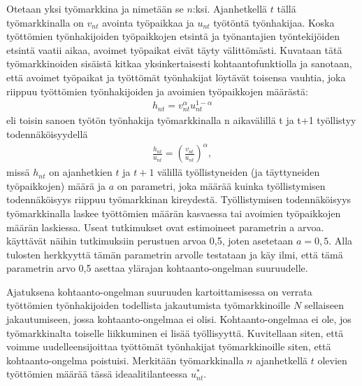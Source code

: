 \documentclass[12pt]{article}
\begin{document}
Otetaan yksi työmarkkina ja nimetään se $n$:ksi. Ajanhetkellä $t$ tällä työmarkkinalla on $v_{nt}$ avointa työpaikkaa ja $u_{nt}$ työtöntä työnhakijaa. Koska työttömien työnhakijoiden työpaikkojen etsintä ja työnantajien työntekijöiden etsintä vaatii aikaa, avoimet työpaikat eivät täyty välittömästi. Kuvataan tätä työmarkkinoiden sisäistä kitkaa yksinkertaisesti kohtaantofunktiolla ja sanotaan, että avoimet työpaikat ja työttömät työnhakijat löytävät toisensa vauhtia, joka riippuu työttömien työnhakijoiden ja avoimien työpaikkojen määrästä: 
\begin{align*}
h_{nt} = v_{nt}^\alpha u_{nt}^{1-\alpha}
\end{align*}
eli toisin sanoen työtön työnhakija työmarkkinalla n aikavälillä t ja t+1 työllistyy todennäköisyydellä 
\begin{align*}
\frac{h_{nt}}{u_{nt}} = \left ( \frac{v_{nt}}{u_{nt}} \right ) ^\alpha,
\end{align*}
missä $h_{nt}$ on ajanhetkien $t$ ja $t+1$ välillä työllistyneiden (ja täyttyneiden työpaikkojen) määrä ja $a$ on parametri, joka määrää kuinka työllistymisen todennäköisyys riippuu työmarkkinan kireydestä. Työllistymisen todennäköisyys työmarkkinalla laskee työttömien määrän kasvaessa tai avoimien työpaikkojen määrän laskiessa. Useat tutkimukset ovat estimoineet parametrin a arvoa.  käyttävät näihin tutkimuksiin perustuen arvoa 0,5, joten asetetaan $a = 0,5$. Alla tulosten herkkyyttä tämän parametrin arvolle testataan ja käy ilmi, että tämä parametrin arvo 0,5 asettaa ylärajan kohtaanto-ongelman suuruudelle.

Ajatuksena kohtaanto-ongelman suuruuden kartoittamisessa on verrata työttömien työnhakijoiden todellista jakautumista työmarkkinoille $N$ sellaiseen jakautumiseen, jossa kohtaanto-ongelmaa ei olisi. Kohtaanto-ongelmaa ei ole, jos työmarkkinalta toiselle liikkuminen ei lisää työllisyyttä. Kuvitellaan siten, että voimme uudelleensijoittaa työttömät työnhakijat työmarkkinoille siten, että kohtaanto-ongelma poistuisi. Merkitään työmarkkinalla $n$ ajanhetkellä $t$ olevien työttömien määrää tässä ideaalitilanteessa $u_{nt}^*$.
\end{document}

